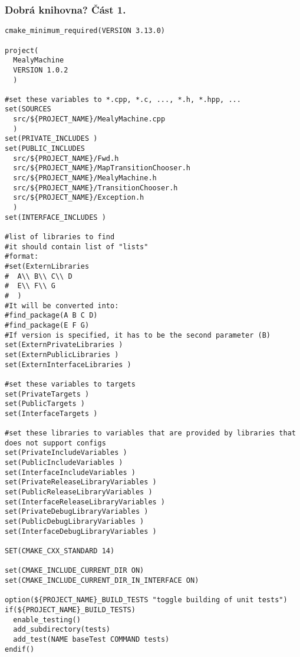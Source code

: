 \begin{frame}[fragile]
\frametitle{Dobrá knihovna? Část 1.}
{\fontsize{3.5}{3.5}
\begin{verbatim}
cmake_minimum_required(VERSION 3.13.0)

project(
  MealyMachine
  VERSION 1.0.2
  )

#set these variables to *.cpp, *.c, ..., *.h, *.hpp, ...
set(SOURCES 
  src/${PROJECT_NAME}/MealyMachine.cpp
  )
set(PRIVATE_INCLUDES )
set(PUBLIC_INCLUDES 
  src/${PROJECT_NAME}/Fwd.h
  src/${PROJECT_NAME}/MapTransitionChooser.h
  src/${PROJECT_NAME}/MealyMachine.h
  src/${PROJECT_NAME}/TransitionChooser.h
  src/${PROJECT_NAME}/Exception.h
  )
set(INTERFACE_INCLUDES )

#list of libraries to find
#it should contain list of "lists"
#format:
#set(ExternLibraries
#  A\\ B\\ C\\ D
#  E\\ F\\ G
#  )
#It will be converted into:
#find_package(A B C D)
#find_package(E F G)
#If version is specified, it has to be the second parameter (B)
set(ExternPrivateLibraries )
set(ExternPublicLibraries )
set(ExternInterfaceLibraries )

#set these variables to targets
set(PrivateTargets )
set(PublicTargets )
set(InterfaceTargets )

#set these libraries to variables that are provided by libraries that does not support configs
set(PrivateIncludeVariables )
set(PublicIncludeVariables )
set(InterfaceIncludeVariables )
set(PrivateReleaseLibraryVariables )
set(PublicReleaseLibraryVariables )
set(InterfaceReleaseLibraryVariables )
set(PrivateDebugLibraryVariables )
set(PublicDebugLibraryVariables )
set(InterfaceDebugLibraryVariables )

SET(CMAKE_CXX_STANDARD 14)

set(CMAKE_INCLUDE_CURRENT_DIR ON)
set(CMAKE_INCLUDE_CURRENT_DIR_IN_INTERFACE ON)

option(${PROJECT_NAME}_BUILD_TESTS "toggle building of unit tests")
if(${PROJECT_NAME}_BUILD_TESTS)
  enable_testing()
  add_subdirectory(tests)
  add_test(NAME baseTest COMMAND tests)
endif()
\end{verbatim}
}
\end{frame}

